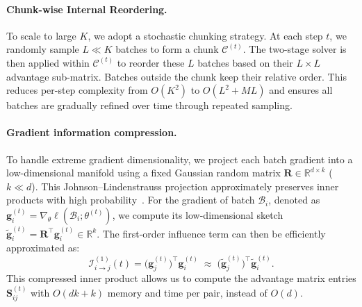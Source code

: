 \paragraph{Chunk-wise Internal Reordering.}
To scale to large $K$, we adopt a stochastic chunking strategy. At each step $t$, we randomly sample $L \ll K$ batches to form a chunk $\mathcal{C}^{(t)}$. The two-stage solver is then applied within $\mathcal{C}^{(t)}$ to reorder these $L$ batches based on their $L \times L$ advantage sub-matrix. Batches outside the chunk keep their relative order. This reduces per-step complexity from $O(K^2)$ to $O(L^2 + ML)$ and ensures all batches are gradually refined over time through repeated sampling.


\paragraph{Gradient information compression.}
To handle extreme gradient dimensionality, we project each batch gradient into a low-dimensional manifold using a fixed Gaussian random matrix $\mathbf{R} \in \mathbb{R}^{d \times k}$ ($k \ll d$). This Johnson–Lindenstrauss projection approximately preserves inner products with high probability~\cite{DBLP:conf/pods/Achlioptas01}. For the gradient of batch $\mathcal{B}_i$, denoted as $\mathbf{g}^{(t)}_i = \nabla_\theta \ell(\mathcal{B}_i; \theta^{(t)})$, we compute its low-dimensional sketch $\tilde{\mathbf{g}}^{(t)}_i = \mathbf{R}^\top \mathbf{g}^{(t)}_i \in \mathbb{R}^k$. The first-order influence term can then be efficiently approximated as:
{
\setlength{\abovedisplayskip}{8pt}
\setlength{\belowdisplayskip}{8pt}
\[
\mathcal{I}^{(1)}_{i \to j}(t) = \bigl(\mathbf{g}^{(t)}_j\bigr)^\top \mathbf{g}^{(t)}_i \;\approx\; \bigl(\tilde{\mathbf{g}}^{(t)}_j\bigr)^\top \tilde{\mathbf{g}}^{(t)}_i.
\]
}
This compressed inner product allows us to compute the advantage matrix entries $\mathbf{S}^{(t)}_{ij}$ with $O(dk + k)$ memory and time per pair, instead of $O(d)$.

